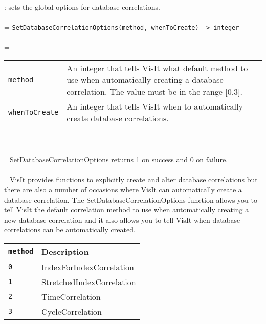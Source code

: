 \documentclass[10pt,a4paper]{report}
\begin{document}
{}
: sets the global options for database correlations.\\[-3mm]

 \\ 
\hangindent=\parindent 
\verb!SetDatabaseCorrelationOptions(method, whenToCreate) -> integer!\\ [-3mm]

 \\ 
\hangindent=\parindent 
\begin{tabular}{lp{9cm}}
\verb!method! & An integer that tells VisIt what default method to use when automatically creating a database correlation. The value must be in the range [0,3]. \\
\verb!whenToCreate! & An integer that tells VisIt when to automatically create database correlations. \\
\end{tabular} \\[-2mm]


 \\ 
\hangindent=\parindent SetDatabaseCorrelationOptions returns 1 on success and 0 on failure. \\[-3mm] 

 \\ 
\hangindent=\parindent VisIt provides functions to explicitly create and alter database correlations but there are also a number of occasions where VisIt can automatically create a database correlation. The SetDatabaseCorrelationOptions function allows you to tell VisIt the default correlation method to use when automatically creating a new database correlation and it also allows you to tell VisIt when database correlations can be automatically created. \\

\begin{tabular}{|l|l|}
\hline
\verb!method! & Description \\
\hline \hline
\verb!0! & IndexForIndexCorrelation \\
\verb!1! & StretchedIndexCorrelation \\
\verb!2! & TimeCorrelation \\
\verb!3! & CycleCorrelation \\
\hline
\end{tabular} \\[-2mm]
\\
\end{document}
